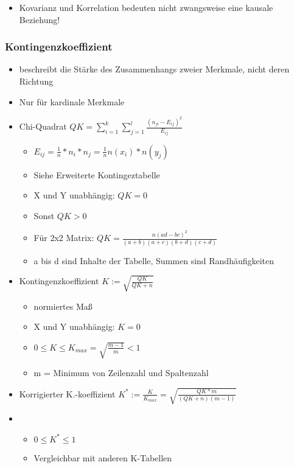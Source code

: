 \documentclass[a4paper]{article}
\begin{document}
\begin{landscape}
\begin{multicols}{4}
\begin{itemize}[noitemsep,nolistsep,leftmargin=*]
\begin{itemize}[noitemsep,nolistsep,leftmargin=*]
        \end{itemize}
        \item Kovarianz und Korrelation bedeuten nicht zwangsweise eine kausale Beziehung!
    \end{itemize}

    \subsubsection*{Kontingenzkoeffizient}
    \begin{itemize}[noitemsep,nolistsep,leftmargin=*]
        \item beschreibt die Stärke des Zusammenhangs zweier Merkmale, nicht deren Richtung
        \item Nur für kardinale Merkmale
        \item Chi-Quadrat $QK = \sum_{i=1}^{k}\sum_{j=1}^{l}\frac{(n_{ji}-E_{ij})^2}{E_{ij}}$
        \begin{itemize}[noitemsep,nolistsep,leftmargin=*]
            \item $E_{ij} = \frac{1}{n}*n_i*n_j = \frac{1}{n}n(x_i)*n(y_j)$
            \item Siehe Erweiterte Kontingeztabelle
            \item X und Y unabhängig: $QK = 0$
            \item Sonst $QK > 0$
            \item Für 2x2 Matrix: $QK = \frac{n(ad-bc)^2}{(a+b)(a+c)(b+d)(c+d)}$
            \item a bis d sind Inhalte der Tabelle, Summen sind Randhäufigkeiten
            
        \end{itemize}
        \item Kontingenzkoeffizient $K := \sqrt{\frac{QK}{QK+n}}$
        \begin{itemize}[noitemsep,nolistsep,leftmargin=*]
            \item normiertes Maß
            \item X und Y unabhängig: $K = 0$
            \item $0  \leq K  \leq K_{max} = \sqrt{\frac{m-1}{m}} < 1$
            \item m = Minimum von Zeilenzahl und Spaltenzahl
        \end{itemize}
        \item Korrigierter K.-koeffizient $K^* := \frac{K}{K_{max}} = \sqrt{\frac{QK*m}{(QK+n)(m-1)}}$
        \item \begin{itemize}[noitemsep,nolistsep,leftmargin=*]
            \item $ 0  \leq K^*  \leq 1$
            \item Vergleichbar mit anderen K-Tabellen
        \end{itemize}
    \end{itemize}



\end{multicols}
\end{landscape}
\end{document}
